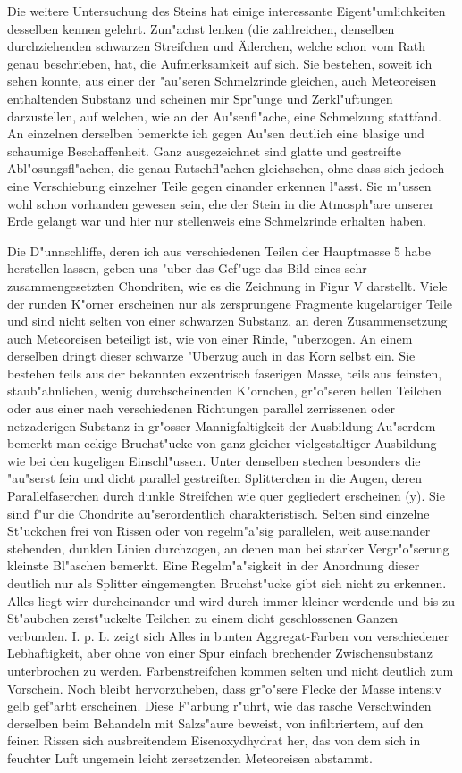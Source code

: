 \documentclass[a4paper, 11pt, oneside]{article}
\begin{document}
Die weitere Untersuchung des Steins hat einige interessante Eigent"umlichkeiten desselben kennen gelehrt. Zun"achst lenken (die zahlreichen, denselben durchziehenden schwarzen Streifchen und Äderchen, welche schon vom Rath genau beschrieben, hat, die Aufmerksamkeit auf sich. Sie bestehen, soweit ich sehen konnte, aus einer der "au"seren Schmelzrinde gleichen, auch Meteoreisen enthaltenden Substanz und scheinen mir Spr"unge und Zerkl"uftungen darzustellen, auf welchen, wie an der Au"senfl"ache, eine Schmelzung stattfand. An einzelnen derselben bemerkte ich gegen Au"sen deutlich eine blasige und schaumige Beschaffenheit. Ganz ausgezeichnet sind glatte und gestreifte Abl"osungsfl"achen, die genau Rutschfl"achen gleichsehen, ohne dass sich jedoch eine Verschiebung einzelner Teile gegen einander erkennen l"asst. Sie m"ussen wohl schon vorhanden gewesen sein, ehe der Stein in die Atmosph"are unserer Erde gelangt war und hier nur stellenweis eine Schmelzrinde erhalten haben.

Die D"unnschliffe, deren ich aus verschiedenen Teilen der Hauptmasse 5 habe herstellen lassen, geben uns "uber das Gef"uge das Bild eines sehr zusammengesetzten Chondriten, wie es die Zeichnung in Figur V darstellt. Viele der runden K"orner erscheinen nur als zersprungene Fragmente kugelartiger Teile und sind nicht selten von einer schwarzen Substanz, an deren Zusammensetzung auch Meteoreisen beteiligt ist, wie von einer Rinde, "uberzogen. An einem derselben dringt dieser schwarze "Uberzug auch in das Korn selbst ein. Sie bestehen teils aus der bekannten exzentrisch faserigen Masse, teils aus feinsten, staub"ahnlichen, wenig durchscheinenden K"ornchen, gr"o"seren hellen Teilchen oder aus einer nach verschiedenen Richtungen parallel zerrissenen oder netzaderigen Substanz in gr"osser Mannigfaltigkeit der Ausbildung Au"serdem bemerkt man eckige Bruchst"ucke von ganz gleicher vielgestaltiger Ausbildung wie bei den kugeligen Einschl"ussen. Unter denselben stechen besonders die "au"serst fein und dicht parallel gestreiften Splitterchen in die Augen, deren Parallelfaserchen durch dunkle Streifchen wie quer gegliedert erscheinen (y). Sie sind f"ur die Chondrite au"serordentlich charakteristisch. Selten sind einzelne St"uckchen frei von Rissen oder von regelm"a"sig parallelen, weit auseinander stehenden, dunklen Linien durchzogen, an denen man bei starker Vergr"o"serung kleinste Bl"aschen bemerkt. Eine Regelm"a"sigkeit in der Anordnung dieser deutlich nur als Splitter eingemengten Bruchst"ucke gibt sich nicht zu erkennen. Alles liegt wirr durcheinander und wird durch immer kleiner werdende und bis zu St"aubchen zerst"uckelte Teilchen zu einem dicht geschlossenen Ganzen verbunden. I. p. L. zeigt sich Alles in bunten Aggregat-Farben von verschiedener Lebhaftigkeit, aber ohne von einer Spur einfach brechender Zwischensubstanz unterbrochen zu werden. Farbenstreifchen kommen selten und nicht deutlich zum Vorschein. Noch bleibt hervorzuheben, dass gr"o"sere Flecke der Masse intensiv gelb gef"arbt erscheinen. Diese F"arbung r"uhrt, wie das rasche Verschwinden derselben beim Behandeln mit Salzs"aure beweist, von infiltriertem, auf den feinen Rissen sich ausbreitendem Eisenoxydhydrat her, das von dem sich in feuchter Luft ungemein leicht zersetzenden Meteoreisen abstammt.
\end{document}
